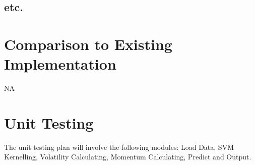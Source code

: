 \documentclass[12pt, titlepage]{article}
\begin{document}
\subsection{etc.}
	
\section{Comparison to Existing Implementation}	

NA

\section{Unit Testing}

The unit testing plan will involve the following modules: Load Data, SVM Kernelling, Volatility Calculating, Momentum Calculating, Predict and Output.\\
\end{document}
